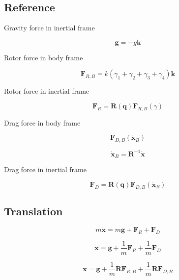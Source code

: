 \subsection{Reference}

Gravity force in inertial frame

\[
\mathbf{g} = -g \mathbf{k}
\]

Rotor force in body frame

\[
\mathbf{F}_{R,B} = k \left( \gamma_1 + \gamma_2 + \gamma_3 + \gamma_4 \right) \mathbf{k}
\]

Rotor force in inertial frame

\[
\mathbf{F}_R = \mathbf{R}(\mathbf{q}) \mathbf{F}_{R,B}(\gamma)
\]

Drag force in body frame

\[
\mathbf{F}_{D,B}(\dot{\mathbf{x}}_B)
\]

\[
\dot{\mathbf{x}}_B = \mathbf{R}^{-1} \dot{\mathbf{x}}
\]

Drag force in inertial frame

\[
\mathbf{F}_D =  \mathbf{R}(\mathbf{q}) \mathbf{F}_{D,B}(\dot{\mathbf{x}}_B)
\]


\subsection{Translation}

\[
m \ddot{\mathbf{x}} =
m \mathbf{g}
+ \mathbf{F}_R
+ \mathbf{F}_D
\]

\[
\ddot{\mathbf{x}} = 
\mathbf{g}
+ \frac{1}{m} \mathbf{F}_R
+ \frac{1}{m} \mathbf{F}_D
\]

\[
\ddot{\mathbf{x}} = 
\mathbf{g}
+ \frac{1}{m} \mathbf{R} \mathbf{F}_{R,B}
+ \frac{1}{m} \mathbf{R} \mathbf{F}_{D,B}
\]



